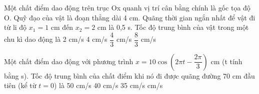   \begin{vidu}%
  	Một chất điểm dao động trên trục Ox quanh vị trí cân bằng chính là gốc tọa độ O. Quỹ đạo của vật là đoạn thẳng dài 4 cm. Quãng thời gian ngắn nhất để vật đi từ li độ $x_1 = 1$ cm đến $x_2 = 2$ cm là 0,5 s. Tốc độ trung bình của vật trong một chu kì dao động là
  	\choice
  	{2 cm/s}
  	{4 cm/s}
  	{$\dfrac{4}{3}$ cm/s}
  	{\True $\dfrac{8}{3}$ cm/s}
  \end{vidu} %
  \begin{vidu}%
  	Một chất điểm dao động với phương trình  $x=10\cos \left( 2\pi t-\dfrac{2\pi}{3} \right)$ cm  (t tính bằng s). Tốc độ trung bình của chất điểm khi nó đi được quãng đường 70 cm đầu tiên (kể từ $t = 0$) là
  	\choice
  	{50 cm/s}
  	{40 cm/s}
  	{35 cm/s}
  	{ cm/s}
  	\loigiai{
  		
  	}
  \end{vidu} %

